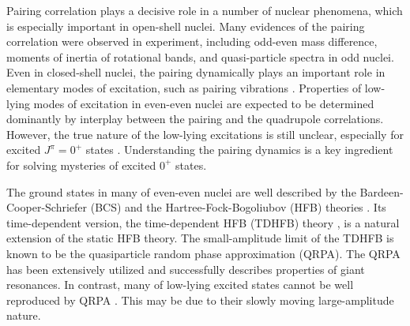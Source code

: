\documentclass[%
superscriptaddress,
preprint,
showpacs,
nofootinbib,
amsmath,amssymb,
aps,
prc,
floatfix ]%
{revtex4-1}
\begin{document}
Pairing correlation plays a decisive role in a number of nuclear phenomena,
which is especially important in open-shell nuclei.
Many evidences of the pairing correlation were observed in experiment,
including odd-even mass difference, moments of inertia of rotational bands,
and quasi-particle spectra in odd nuclei.
Even in closed-shell nuclei, the pairing dynamically plays an important
role in elementary modes of excitation, such as pairing vibrations
\cite{BM75, RS80, BB05}.
Properties of low-lying modes of excitation in even-even nuclei are
expected to be determined dominantly by interplay between
the pairing and the quadrupole correlations.
However, the true nature of the low-lying excitations is still unclear,
especially for excited $J^\pi=0^+$ states \cite{garrett,HW11}.
Understanding the pairing dynamics is a key ingredient for solving
mysteries of excited $0^+$ states.

The ground states in many of even-even nuclei are well
described by the Bardeen-Cooper-Schriefer (BCS)
and the Hartree-Fock-Bogoliubov (HFB) theories \cite{RS80,BHR03}.
Its time-dependent version, 
the time-dependent HFB (TDHFB) theory \cite{BR86,NMMY16},
is a natural extension of the static HFB theory.
The small-amplitude limit of the TDHFB is known to be 
the quasiparticle random phase approximation (QRPA).
The QRPA has been extensively utilized and successfully
describes properties of giant resonances.
In contrast, many of low-lying excited states
cannot be well reproduced by QRPA \cite{NMMY16}.
This may be due to their slowly moving large-amplitude nature.

\end{document}
